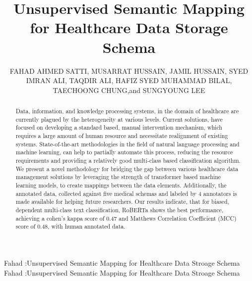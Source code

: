 \documentclass{ieeeaccess}
\begin{document}

\title{Unsupervised Semantic Mapping for Healthcare Data Storage Schema}

\author{ \uppercase{Fahad Ahmed Satti},
	\uppercase{Musarrat Hussain},
	\uppercase{Jamil Hussain},
	\uppercase{Syed Imran Ali}, %
	\uppercase{Taqdir Ali},
	\uppercase{Hafiz Syed Muhammad Bilal},
	\uppercase{TaeChoong Chung},and  \uppercase {Sungyoung Lee}
	}
\address[1]{Department of Computer Science and Engineering, Kyung Hee University, Seocheon-dong, Giheung-gu South Korea (e-mail: \{fahad.satti, musarrat.hussain, imran.ali, bilalrizvi, sylee\}@oslab.khu.ac.kr,  tcchung@khu.ac.kr)}
\address[2]{National Univeristy of Sciences and Technology, School of Electrical Engineering and Computer Science NUST-SEECS, Islamabad, Pakistan (e-mail: \{fahad.satti, bilal.ali\}@seecs.edu.pk)}
\address[3]{Department of Data Science, Sejong University, Seoul, South Korea (e-mail: jamil@sejong.ac.kr)}
\tfootnote{}



\markboth
{Fahad \headeretal:Unsupervised Semantic Mapping for Healthcare Data Stroage Schema}
{Fahad \headeretal:Unsupervised Semantic Mapping for Healthcare Data Stroage Schema}



\begin{abstract}
Data, information, and knowledge processing systems, in the domain of healthcare are currently plagued by the heterogeneity at various levels. Current solutions, have focused on developing a standard based, manual intervention mechanism, which requires a large amount of human resource and necessitate realignment of existing systems. State-of-the-art methodologies in the field of natural language processing and machine learning, can help to partially automate this process, reducing the resource requirements and providing a relatively good multi-class based classification algorithm. We present a novel methodology for bridging the gap between various healthcare data management solutions by leveraging the strength of transformer based machine learning models, to create mappings between the data elements. Additionally, the annotated data, collected against five medical schemas and labeled by 4 annotators is made available for helping future researchers. Our results indicate, that for biased, dependent multi-class text classification, RoBERTa shows the best performance, achieving a cohen's kappa score of 0.47 and Matthews Correlation Coefficient (MCC) score of 0.48, with human annotated data.
\end{abstract}
\end{document}
